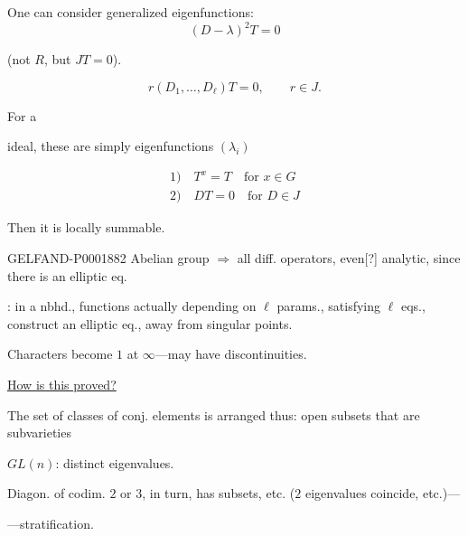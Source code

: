One can consider generalized eigenfunctions:
\begin{equation*}(D-\lambda)^2T=0\end{equation*}

(not $R$, but $JT=0$).

\begin{equation*}r (D_1,\ldots, D_\ell)T=0,\qquad r\in J.\end{equation*}

For a
ideal, these are simply eigenfunctions $(\lambda_i)$

\uline{}

\begin{gather*}
1)\quad T^x=T\quad\text{for }x\in G\\
2)\quad DT=0\quad\text{for }D\in J
\end{gather*}

Then it is locally summable.

\begin{GelfandAdjacentEvidence}{GELFAND-P000188}{2}
Abelian group $\Rightarrow$ all diff. operators, even[?] analytic, since there is an elliptic eq.
\end{GelfandAdjacentEvidence}

: in a nbhd., functions actually depending on $\ell$ params., satisfying $\ell$ eqs., construct an elliptic eq., away from singular points.

Characters become $1$ at $\infty$—may have discontinuities.

\underline{How is this proved?}

The set of classes of conj. elements is arranged thus: open subsets that are subvarieties

$GL (n)$: distinct eigenvalues.

Diagon. of codim. $2$ or $3$, in turn, has subsets, etc. ($2$ eigenvalues coincide, etc.)—

—stratification.



